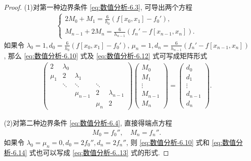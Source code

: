 \documentclass[../../main.tex]{subfiles}
\begin{document}
\begin{proof}
(1)对第一种边界条件 \eqref{eq:数值分析-6.3}, 可导出两个方程
\begin{align}
\begin{cases}
2 M_0 + M_1 = \frac{6}{h_0} (f[x_0, x_1] - f_0'), \\
M_{n - 1} + 2 M_n = \frac{6}{h_{n - 1}} (f_n' - f[x_{n - 1}, x_n]).
\end{cases} \label{eq:数值分析-6.12}
\end{align}
如果令 $\lambda_0 = 1, d_0 = \frac{6}{h_0} (f[x_0, x_1] - f_0')$, $\mu_n = 1, d_n = \frac{6}{h_{n - 1}} (f_n' - f[x_{n - 1}, x_n])$, 那么 \eqref{eq:数值分析-6.10} 式及 \eqref{eq:数值分析-6.12} 式可写成矩阵形式
\begin{align}
\begin{pmatrix}
2 & \lambda_0 \\
\mu_1 & 2 & \lambda_1 \\
& \ddots & \ddots & \ddots \\
& & \mu_{n - 1} & 2 & \lambda_{n - 1} \\
& & & \mu_n & 2
\end{pmatrix}
\begin{pmatrix}
M_0 \\
M_1 \\
\vdots \\
M_{n - 1} \\
M_n
\end{pmatrix}
=
\begin{pmatrix}
d_0 \\
d_1 \\
\vdots \\
d_{n - 1} \\
d_n
\end{pmatrix}. \label{eq:数值分析-6..13}
\end{align}

(2)对第二种边界条件 \eqref{eq:数值分析-6.4}, 直接得端点方程
\begin{align}
M_0 = f_0'', \quad M_n = f_n''. \label{eq:数值分析-6.14}
\end{align}
如果令 $\lambda_0 = \mu_n = 0, d_0 = 2 f_0'', d_n = 2 f_n''$, 则 \eqref{eq:数值分析-6.10} 式和 \eqref{eq:数值分析-6.14} 式也可以写成 \eqref{eq:数值分析-6..13} 式的形式.


\end{proof}
\end{document}
